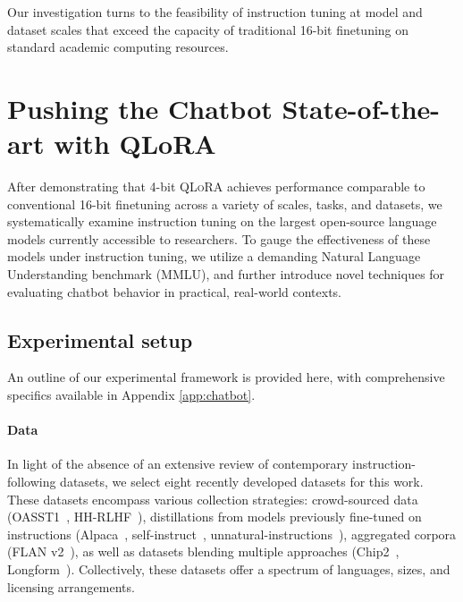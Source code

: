 Our investigation turns to the feasibility of instruction tuning at model and dataset scales that exceed the capacity of traditional 16-bit finetuning on standard academic computing resources.

\section{Pushing the Chatbot State-of-the-art with QLoRA}
\label{sec:pushing}
After demonstrating that 4-bit \textsc{QLoRA} achieves performance comparable to conventional 16-bit finetuning across a variety of scales, tasks, and datasets, we systematically examine instruction tuning on the largest open-source language models currently accessible to researchers. To gauge the effectiveness of these models under instruction tuning, we utilize a demanding Natural Language Understanding benchmark (MMLU), and further introduce novel techniques for evaluating chatbot behavior in practical, real-world contexts.

\subsection{Experimental setup}
An outline of our experimental framework is provided here, with comprehensive specifics available in Appendix \ref{app:chatbot}.

\paragraph{Data} In light of the absence of an extensive review of contemporary instruction-following datasets, we select eight recently developed datasets for this work. These datasets encompass various collection strategies: crowd-sourced data (OASST1~\citep{kopf2023openassistant}, HH-RLHF~\citep{bai2022training}), distillations from models previously fine-tuned on instructions (Alpaca~\citep{alpaca}, self-instruct~\citep{wang2022self}, unnatural-instructions~\citep{honovich2022unnatural}), aggregated corpora (FLAN v2~\citep{chung2022scaling}), as well as datasets blending multiple approaches (Chip2~\citep{laion2023}, Longform~\citep{koksal2023longform}). Collectively, these datasets offer a spectrum of languages, sizes, and licensing arrangements.

